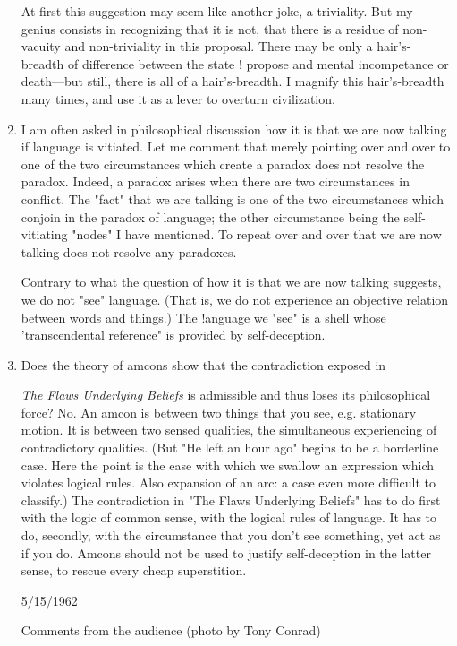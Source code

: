 \documentclass[10pt,twoside]{memoir}
\newcommand{\essaytitle}[1]{
	\emph{#1}}
\begin{document}
\begin{enumerate}
At first this suggestion may seem like another joke, a triviality. But my 
genius consists in recognizing that it is not, that there is a residue of 
non-vacuity and non-triviality in this proposal. There may be only a 
hair's-breadth of difference between the state ! propose and mental 
incompetance or death---but still, there is all of a hair's-breadth. I magnify 
this hair's-breadth many times, and use it as a lever to overturn civilization. 

\item I am often asked in philosophical discussion how it is that we are 
now talking if language is vitiated. Let me comment that merely pointing 
over and over to one of the two circumstances which create a paradox does 
not resolve the paradox. Indeed, a paradox arises when there are two 
circumstances in conflict. The "fact" that we are talking is one of the two 
circumstances which conjoin in the paradox of language; the other 
circumstance being the self-vitiating "nodes" I have mentioned. To repeat 
over and over that we are now talking does not resolve any paradoxes. 

Contrary to what the question of how it is that we are now talking 
suggests, we do not "see" language. (That is, we do not experience an 
objective relation between words and things.) The !anguage we "see" is a 
shell whose 'transcendental reference" is provided by self-deception. 

\item Does the theory of amcons show that the contradiction exposed in 
\essaytitle{The Flaws Underlying Beliefs} is admissible and thus loses its philosophical 
force? No. An amcon is between two things that you see, e.g. stationary 
motion. It is between two sensed qualities, the simultaneous experiencing of 
contradictory qualities. (But "He left an hour ago" begins to be a borderline 
case. Here the point is the ease with which we swallow an expression which 
violates logical rules. Also expansion of an arc: a case even more difficult to 
classify.) The contradiction in "The Flaws Underlying Beliefs" has to do first 
with the logic of common sense, with the logical rules of language. It has to 
do, secondly, with the circumstance that you don't see something, yet act as 
if you do. Amcons should not be used to justify self-deception in the latter 
sense, to rescue every cheap superstition. 


{
5/15/1962 


Comments from the audience 
(photo by Tony Conrad) 


}
\end{enumerate}
\end{document}
